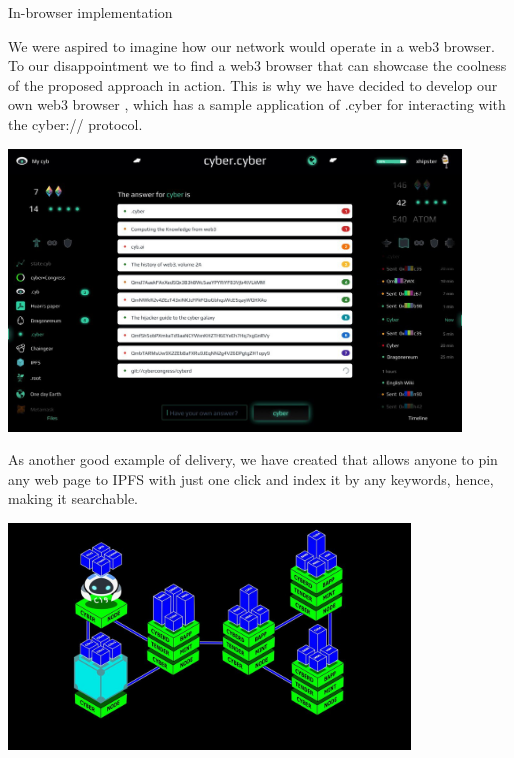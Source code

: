\documentclass[8pt,oneside]{amsart}
\makeatletter
\newcommand{\linkred}[2]{\href{#1}{\color{red}{#2}}}
\renewcommand\subsection{\@startsection{subsection}
                                    {2}{\z@}
                                    {-3.25ex\@plus -1ex \@minus -.2ex}
                                    {0ex \@plus .2ex}
                                    {\play\Large}
                        }
\newcommand{\titleSection}[1]{\subsection{#1}}
\newcommand{\code}[1]{{\PlayBold #1}}
\newenvironment{Figure}
  {\par\medskip\noindent\minipage{\linewidth}}
  {\endminipage\par\medskip}
\makeatother
\begin{document}
\titleSection{In-browser implementation}\label{In-browser implementation}

We were aspired to imagine how our network would operate in a web3 browser. To our disappointment we \linkred{https://github.com/cybercongress/cyb/blob/master/docs/comparison.md}{were not able} to find a web3 browser that can showcase the coolness of the proposed approach in action. This is why we have decided to develop our own web3 browser \linkred{https://github.com/cybercongress/cyb/blob/master/docs/cyb.md}{cyb}, which has a sample application of .cyber for interacting with the \code{cyber://} protocol.

\begin{Figure}
  \medskip
  \centering
  \includegraphics[width=0.9\textwidth]{cyb.jpg}
  \medskip
\end{Figure}

As another good example of delivery, we have created \linkred{https://github.com/cybercongress/cyb-virus}{a Chrome extension} that allows anyone to pin any web page to IPFS with just one click and index it by any keywords, hence, making it searchable.

\begin{Figure}
  \centering
  \includegraphics[width=0.8\textwidth]{architecture.jpg}
\end{Figure}
\end{document}
